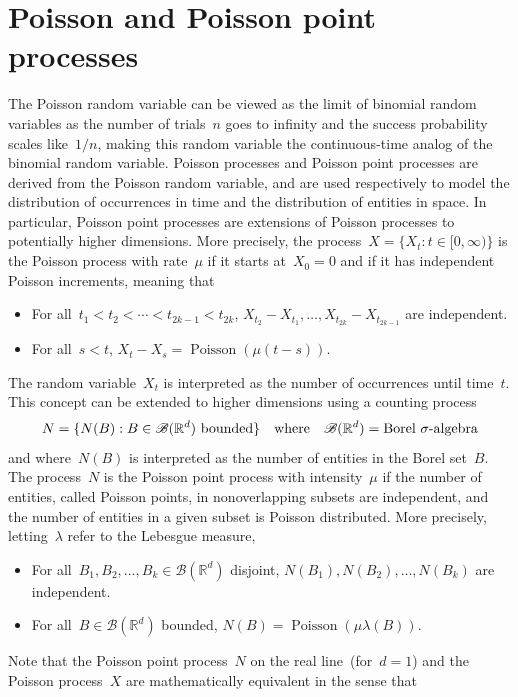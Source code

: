 \documentclass[10pt,a4paper]{amsart}
\newcommand{\R}{\mathbb{R}}
\newcommand{\B}{\mathscr{B}}
\DeclareMathOperator{\poisson}{Poisson}
\begin{document}
\section{Poisson and Poisson point processes}
 The Poisson random variable can be viewed as the limit of binomial random variables as the number of trials~$n$ goes to infinity and the success probability scales like~$1/n$, making this random variable the continuous-time analog of the binomial random variable.
 Poisson processes and Poisson point processes are derived from the Poisson random variable, and are used respectively to model the distribution of occurrences in time and the distribution of entities in space.
 In particular, Poisson point processes are extensions of Poisson processes to potentially higher dimensions.
 More precisely, the process~$X = \{X_t : t \in [0, \infty) \}$ is the Poisson process with rate~$\mu$ if it starts at~$X_0 = 0$ and if it has independent Poisson increments, meaning that
\begin{itemize}[leftmargin=36pt]
\item[(A1)] For all~$t_1 < t_2 < \cdots < t_{2k - 1} < t_{2k}$, $X_{t_2} - X_{t_1}, \ldots, X_{t_{2k}} - X_{t_{2k - 1}}$ are independent. \vspace*{4pt}
\item[(A2)] For all~$s < t$, $X_t - X_s = \poisson (\mu (t - s))$.
\end{itemize}
 The random variable~$X_t$ is interpreted as the number of occurrences until time~$t$.
 This concept can be extended to higher dimensions using a counting process
 $$ N = \{N (B) : B \in \B (\R^d) \ \hbox{bounded} \} \quad \hbox{where} \quad \B (\R^d) = \hbox{Borel~$\sigma$-algebra} $$
 and where~$N (B)$ is interpreted as the number of entities in the Borel set~$B$.
 The process~$N$ is the Poisson point process with intensity~$\mu$ if the number of entities, called Poisson points, in nonoverlapping subsets are independent, and the number of entities in a given subset is Poisson distributed.
 More precisely, letting~$\lambda$ refer to the Lebesgue measure,
\begin{itemize}[leftmargin=40pt]
\item[(A1')] For all~$B_1, B_2, \ldots, B_k \in \B (\R^d)$ disjoint, $N (B_1), N (B_2), \ldots, N (B_k)$ are independent. \vspace*{4pt}
\item[(A2')] For all~$B \in \B (\R^d)$ bounded, $N (B) = \poisson (\mu \lambda (B))$.
\end{itemize}
 Note that the Poisson point process~$N$ on the real line~(for~$d = 1$) and the Poisson process~$X$ are mathematically equivalent in the sense that
\end{document}
